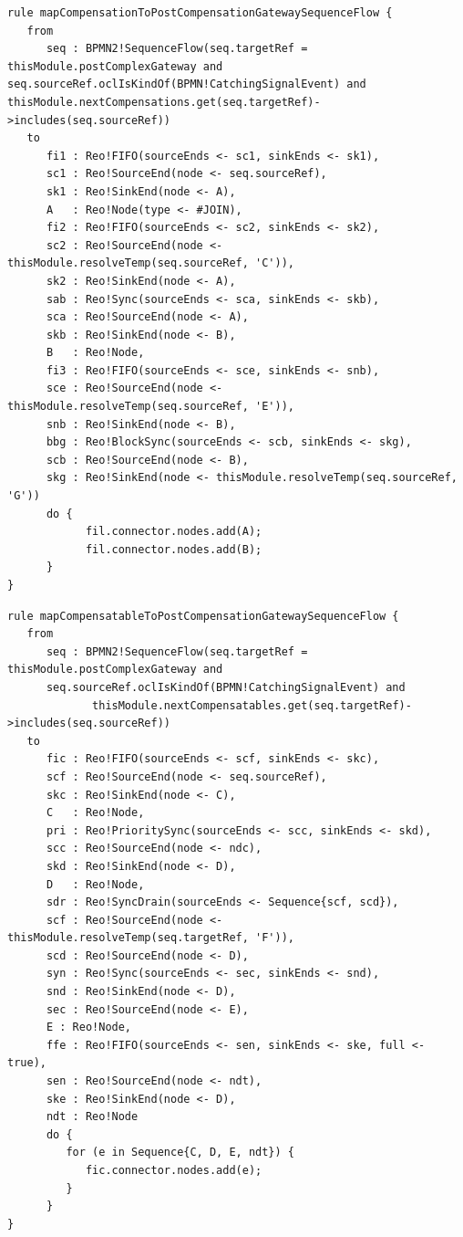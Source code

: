 \begin{lstlisting}[float,frame=single,caption=Mapping the compensation completion,label=lst:complexgwtaska]  
rule mapCompensationToPostCompensationGatewaySequenceFlow {
   from
      seq : BPMN2!SequenceFlow(seq.targetRef = thisModule.postComplexGateway and seq.sourceRef.oclIsKindOf(BPMN!CatchingSignalEvent) and thisModule.nextCompensations.get(seq.targetRef)->includes(seq.sourceRef))
   to
      fi1 : Reo!FIFO(sourceEnds <- sc1, sinkEnds <- sk1),
      sc1 : Reo!SourceEnd(node <- seq.sourceRef),
      sk1 : Reo!SinkEnd(node <- A),
      A   : Reo!Node(type <- #JOIN),
      fi2 : Reo!FIFO(sourceEnds <- sc2, sinkEnds <- sk2),
      sc2 : Reo!SourceEnd(node <- thisModule.resolveTemp(seq.sourceRef, 'C')),
      sk2 : Reo!SinkEnd(node <- A),      
      sab : Reo!Sync(sourceEnds <- sca, sinkEnds <- skb),
      sca : Reo!SourceEnd(node <- A),
      skb : Reo!SinkEnd(node <- B),      
      B   : Reo!Node,
      fi3 : Reo!FIFO(sourceEnds <- sce, sinkEnds <- snb),
      sce : Reo!SourceEnd(node <- thisModule.resolveTemp(seq.sourceRef, 'E')),
      snb : Reo!SinkEnd(node <- B),
      bbg : Reo!BlockSync(sourceEnds <- scb, sinkEnds <- skg),
      scb : Reo!SourceEnd(node <- B),
      skg : Reo!SinkEnd(node <- thisModule.resolveTemp(seq.sourceRef, 'G'))
      do {
            fil.connector.nodes.add(A);
            fil.connector.nodes.add(B);
      }
}
\end{lstlisting}


\begin{lstlisting}[float,frame=single,caption=Mapping the task completion,label=lst:complexgwtaskb]  
rule mapCompensatableToPostCompensationGatewaySequenceFlow {
   from
      seq : BPMN2!SequenceFlow(seq.targetRef = thisModule.postComplexGateway and
      seq.sourceRef.oclIsKindOf(BPMN!CatchingSignalEvent) and
             thisModule.nextCompensatables.get(seq.targetRef)->includes(seq.sourceRef))
   to
      fic : Reo!FIFO(sourceEnds <- scf, sinkEnds <- skc),
      scf : Reo!SourceEnd(node <- seq.sourceRef),
      skc : Reo!SinkEnd(node <- C),
      C   : Reo!Node,
      pri : Reo!PrioritySync(sourceEnds <- scc, sinkEnds <- skd),
      scc : Reo!SourceEnd(node <- ndc),
      skd : Reo!SinkEnd(node <- D),
      D   : Reo!Node,
      sdr : Reo!SyncDrain(sourceEnds <- Sequence{scf, scd}),
      scf : Reo!SourceEnd(node <- thisModule.resolveTemp(seq.targetRef, 'F')),
      scd : Reo!SourceEnd(node <- D),
      syn : Reo!Sync(sourceEnds <- sec, sinkEnds <- snd),
      snd : Reo!SinkEnd(node <- D),
      sec : Reo!SourceEnd(node <- E),
      E : Reo!Node,
      ffe : Reo!FIFO(sourceEnds <- sen, sinkEnds <- ske, full <- true),
      sen : Reo!SourceEnd(node <- ndt),
      ske : Reo!SinkEnd(node <- D),
      ndt : Reo!Node
      do {
         for (e in Sequence{C, D, E, ndt}) {       
            fic.connector.nodes.add(e);
         }
      }
}
\end{lstlisting}

